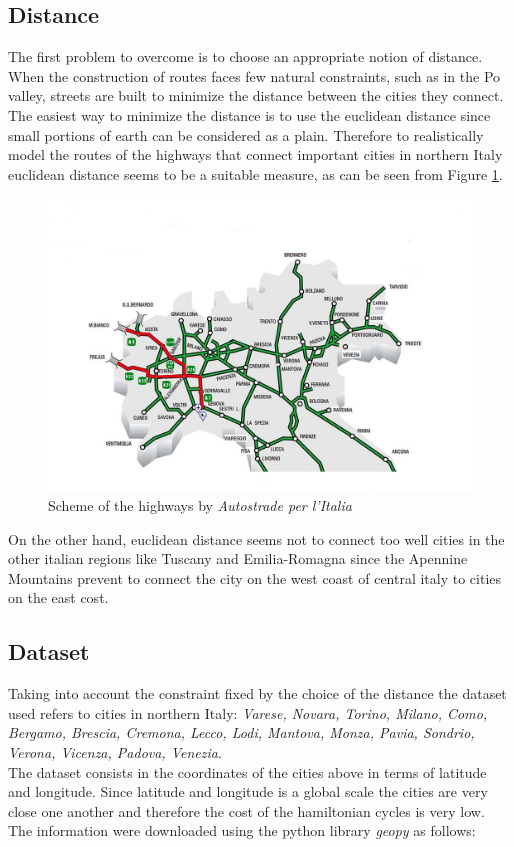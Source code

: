 \documentclass{article}
\begin{document}
\subsection{Distance}
The first problem to overcome is to choose an appropriate notion of distance. When the construction of routes faces few natural constraints, such as in the Po valley, streets are built to minimize the distance between the cities they connect. The easiest way to minimize the distance is to use the euclidean distance since small portions of earth can be considered as a plain. Therefore to realistically model the routes of the highways that connect important cities in northern Italy euclidean distance seems to be a suitable measure, as can be seen from Figure \ref{autostrade}.
\begin{figure}[H] 
\includegraphics[scale=0.4]{autostrade.jpg} 
\centering
\caption{Scheme of the highways by \textit{Autostrade per l'Italia}\cite{autostrade}} \label{autostrade}
\end{figure}
\noindent On the other hand, euclidean distance seems not to connect too well cities in the other italian regions like Tuscany and Emilia-Romagna since the Apennine Mountains prevent to connect the city on the west coast of central italy to cities on the east cost.


\subsection{Dataset}
Taking into account the constraint fixed by the choice of the distance the dataset used refers to cities in northern Italy: \textit{Varese, Novara, Torino, Milano, Como, Bergamo, Brescia, Cremona, Lecco, Lodi, Mantova, Monza, Pavia, Sondrio, Verona, Vicenza, Padova, Venezia}. \\
The dataset consists in the coordinates of the cities above in terms of latitude and longitude. Since latitude and longitude is a global scale the cities are very close one another and therefore the cost of the hamiltonian cycles is very low.\\
The information were downloaded using the python library \textit{geopy} as follows:
\end{document}
